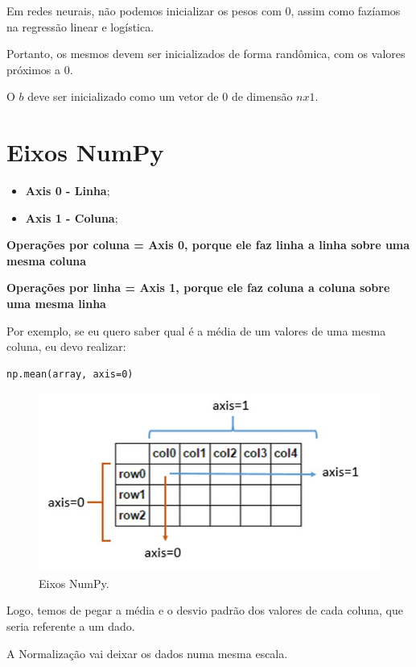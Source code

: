 \documentclass[12pt]{article}
\providecommand{\tightlist}{%
\setlength{\itemsep}{0pt}\setlength{\parskip}{0pt}}
\begin{document}
Em redes neurais, não podemos inicializar os pesos com \(0\), assim como
fazíamos na regressão linear e logística.

Portanto, os mesmos devem ser inicializados de forma randômica, com os
valores próximos a 0.

O \(b\) deve ser inicializado como um vetor de \(0\) de dimensão
\(nx1\).


\hypertarget{eixos-numpy}{%
\section{Eixos NumPy}\label{eixos-numpy}}

\begin{itemize}
\tightlist
\item
  \textbf{Axis 0 - Linha};
\item
  \textbf{Axis 1 - Coluna};
\end{itemize}

\textbf{Operações por coluna = Axis 0, porque ele faz linha a linha
sobre uma mesma coluna}

\textbf{Operações por linha = Axis 1, porque ele faz coluna a coluna
sobre uma mesma linha}

    Por exemplo, se eu quero saber qual é a média de um valores de uma mesma
coluna, eu devo realizar:

\begin{verbatim}
np.mean(array, axis=0)
\end{verbatim}

\begin{figure}
  \centering
  \includegraphics[width=0.8\linewidth]{imgs/axis_numpy.jpg}
  \caption{Eixos NumPy.}
\end{figure}

    Logo, temos de pegar a média e o desvio padrão dos valores de cada
coluna, que seria referente a um dado.

    A Normalização vai deixar os dados numa mesma escala.
\end{document}
